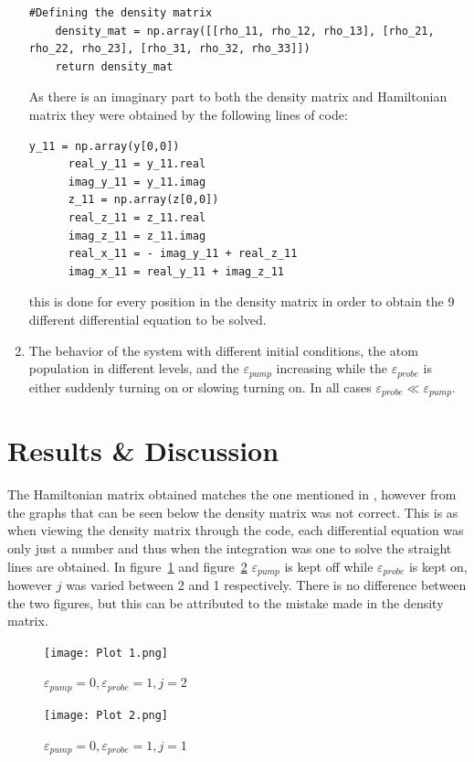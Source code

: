\documentclass[12pt, a4paper]{article}
\begin{document}
\begin{enumerate}
\begin{lstlisting}[language=iPython]
    #Defining the density matrix
    density_mat = np.array([[rho_11, rho_12, rho_13], [rho_21, rho_22, rho_23], [rho_31, rho_32, rho_33]])
    return density_mat
    \end{lstlisting}
    As there is an imaginary part to both the density matrix and Hamiltonian matrix they were obtained by the following lines of code:
    \begin{lstlisting}[language=iPython]
      y_11 = np.array(y[0,0])
      real_y_11 = y_11.real
      imag_y_11 = y_11.imag
      z_11 = np.array(z[0,0])
      real_z_11 = z_11.real
      imag_z_11 = z_11.imag
      real_x_11 = - imag_y_11 + real_z_11
      imag_x_11 = real_y_11 + imag_z_11
    \end{lstlisting}
    this is done for every position in the density matrix in order to obtain the 9 different differential equation to be solved.

    \item The behavior of the system with different initial conditions, the atom population in different levels, and the \(\varepsilon_{pump}\) increasing while the \(\varepsilon_{probe}\) is either suddenly turning on or slowing turning on. In all cases \(\varepsilon_{probe} \ll \varepsilon_{pump}\).
  \end{enumerate}

\section{Results \& Discussion}
The Hamiltonian matrix obtained matches the one mentioned in \cite{erickson}, however from the graphs that can be seen below the density matrix was not correct. This is as when viewing the density matrix through the code, each differential equation was only just a number and thus when the integration was one to solve the straight lines are obtained. In figure~\ref{fig:fig1} and figure~\ref{fig:fig2} \(\varepsilon_{pump}\) is kept off while \(\varepsilon_{probe}\) is kept on, however \(j\) was varied between 2 and 1 respectively. There is no difference between the two figures, but this can be attributed to the mistake made in the density matrix.

\begin{figure}[H]
  \centering
  \texttt{[image: Plot 1.png]}\caption{\(\varepsilon_{pump} = 0, \varepsilon_{probe}= 1, j=2\)}\label{fig:fig1}
\end{figure}

\begin{figure}[H]
  \centering
  \texttt{[image: Plot 2.png]}\caption{\(\varepsilon_{pump} = 0, \varepsilon_{probe}= 1, j=1\)}\label{fig:fig2}
\end{figure}
\end{document}
